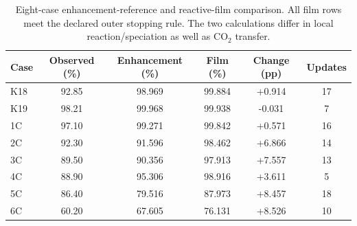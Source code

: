 \begin{table}[pos=htbp]
\centering
\caption{Eight-case enhancement-reference and reactive-film comparison. All film rows meet the declared outer stopping rule. The two calculations differ in local reaction/speciation as well as CO$_2$ transfer.}
\label{tab:film-capture}
\small
\begin{tabular}{@{}l S[table-format=2.2] S[table-format=2.3] S[table-format=2.3] S[table-format=-1.3] S[table-format=2.0]@{}}
\toprule
Case & {Observed (\%)} & {Enhancement (\%)} & {Film (\%)} & {Change (pp)} & {Updates} \\
\midrule
K18 & 92.85 & 98.969 & 99.884 & +0.914 & 17 \\
K19 & 98.21 & 99.968 & 99.938 & -0.031 & 7 \\
1C & 97.10 & 99.271 & 99.842 & +0.571 & 16 \\
2C & 92.30 & 91.596 & 98.462 & +6.866 & 14 \\
3C & 89.50 & 90.356 & 97.913 & +7.557 & 13 \\
4C & 88.90 & 95.306 & 98.916 & +3.611 & 5 \\
5C & 86.40 & 79.516 & 87.973 & +8.457 & 18 \\
6C & 60.20 & 67.605 & 76.131 & +8.526 & 10 \\
\bottomrule
\end{tabular}
\end{table}
